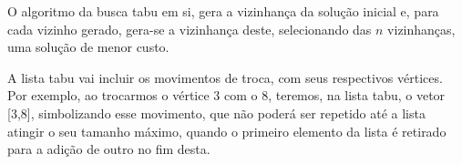 O algoritmo da busca tabu em si, gera a vizinhança da solução inicial e, para cada vizinho gerado, gera-se a vizinhança deste, selecionando das $n$ vizinhanças, uma solução de menor custo.

A lista tabu vai incluir os movimentos de troca, com seus respectivos vértices. Por exemplo, ao trocarmos o vértice 3 com o 8, teremos, na lista tabu, o vetor [3,8], simbolizando esse movimento, que não poderá ser repetido até a lista atingir o seu tamanho máximo, quando o primeiro elemento da lista é retirado para a adição de outro no fim desta.